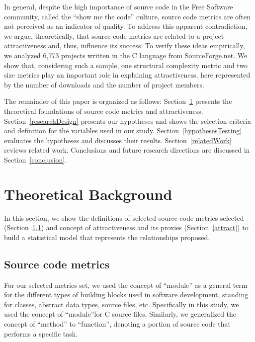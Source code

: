 \documentclass[conference]{IEEEtran}
\newcommand{\TODO}[1]{{\color{red}\textbf{\uwave{#1}}}}
\begin{document}
In general, despite the high importance of source code in the Free Software
community, called the ``show me the code'' culture, source code metrics are
often not perceived as an indicator of quality.
%
To address this apparent contradiction, we argue, theoretically, that source
code metrics are related to a project attractiveness and, thus, influence its success.
%
To verify these ideas empirically, we analyzed 6,773 projects
written in the C language from SourceForge.net.
%
We show that, considering such a sample, one structural complexity metric
and two size metrics play an important role in explaining attractiveness,
here represented by the number of downloads and the number of project members.



The remainder of this paper is organized as follows:
%
Section~\ref{background} presents the theoretical foundations of source code
metrics and attractiveness.
%
Section~\ref{researchDesign} presents our hypotheses and shows the selection criteria and definition for
the variables used in our study.
%
Section~\ref{hypothesesTesting} evaluates the hypotheses and discusses 
their results.
%
Section~\ref{relatedWork} reviews related work.
%
Conclusions and future research directions are discussed in Section~\ref{conclusion}.


\section{Theoretical Background}  %
\label{background}

In this section, we show the definitions of selected source code metrics
selected (Section~\ref{scm}) and concept of attractiveness and its proxies (Section~\ref{attract})
to build a statistical model that represents the relationships proposed.

\subsection{Source code metrics}
\label{scm}

For our selected metrics set, we used the concept of ``module''
as a general term for the different types of building blocks used in software
development, standing for classes, abstract data types, source files, etc. 
%
Specifically in this study, we used the concept of ``module''for C source files.
%
Similarly, we generalized the concept of ``method''
to ``function'', denoting a portion of source code that performs a specific task.
\end{document}
